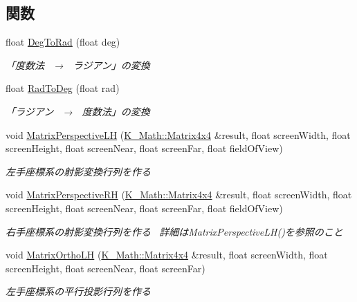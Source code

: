 \subsection*{関数}
\begin{DoxyCompactItemize}
\item 
float \mbox{\hyperlink{namespace_k___math_a51746a69b3cdedea6ac164f799600c98}{Deg\+To\+Rad}} (float deg)
\begin{DoxyCompactList}\small\item\em 「度数法　→　ラジアン」の変換 \end{DoxyCompactList}\item 
float \mbox{\hyperlink{namespace_k___math_a4ab382b67d996b4862e30be45875740d}{Rad\+To\+Deg}} (float rad)
\begin{DoxyCompactList}\small\item\em 「ラジアン　→　度数法」の変換 \end{DoxyCompactList}\item 
void \mbox{\hyperlink{namespace_k___math_ab1c2ee328b8f85662df5bd54dfd6c376}{Matrix\+Perspective\+LH}} (\mbox{\hyperlink{namespace_k___math_a345271af9d32dff2c964bc679b13b45c}{K\+\_\+\+Math\+::\+Matrix4x4}} \&result, float screen\+Width, float screen\+Height, float screen\+Near, float screen\+Far, float field\+Of\+View)
\begin{DoxyCompactList}\small\item\em 左手座標系の射影変換行列を作る \end{DoxyCompactList}\item 
void \mbox{\hyperlink{namespace_k___math_acf1260b151f1893d96d46b75030a231c}{Matrix\+Perspective\+RH}} (\mbox{\hyperlink{namespace_k___math_a345271af9d32dff2c964bc679b13b45c}{K\+\_\+\+Math\+::\+Matrix4x4}} \&result, float screen\+Width, float screen\+Height, float screen\+Near, float screen\+Far, float field\+Of\+View)
\begin{DoxyCompactList}\small\item\em 右手座標系の射影変換行列を作る~\newline
詳細は\+Matrix\+Perspective\+L\+H()を参照のこと \end{DoxyCompactList}\item 
void \mbox{\hyperlink{namespace_k___math_a9109e2b71d7577a4628c69213f717438}{Matrix\+Ortho\+LH}} (\mbox{\hyperlink{namespace_k___math_a345271af9d32dff2c964bc679b13b45c}{K\+\_\+\+Math\+::\+Matrix4x4}} \&result, float screen\+Width, float screen\+Height, float screen\+Near, float screen\+Far)
\begin{DoxyCompactList}\small\item\em 左手座標系の平行投影行列を作る \end{DoxyCompactList}\item 

\end{DoxyCompactItemize}
